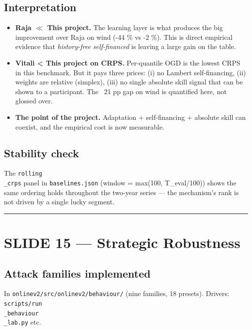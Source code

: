 \documentclass[11pt]{article}
\begin{document}
\subsection{Interpretation}


\begin{itemize}
\item \textbf{Raja $\ll$ This project.} The learning layer is what produces the big improvement over Raja on wind (-44 \% vs -2 \%). This is direct empirical evidence that \emph{history-free self-financed} is leaving a large gain on the table.
\item \textbf{Vitali < This project on CRPS.} Per-quantile OGD is the lowest CRPS in this benchmark. But it pays three prices: (i) no Lambert self-financing, (ii) weights are relative (simplex), (iii) no single absolute skill signal that can be shown to a participant. The ~21 pp gap on wind is quantified here, not glossed over.
\item \textbf{The point of the project.} Adaptation + self-financing + absolute skill can coexist, and the empirical cost is now measurable.
\end{itemize}

\subsection{Stability check}


The \texttt{rolling\\_crps} panel in \texttt{baselines.json} (window = max(100, T\_eval/100)) shows the same ordering holds throughout the two-year series --- the mechanism's rank is not driven by a single lucky segment.

\bigskip\hrule\bigskip

\section{SLIDE 15 --- Strategic Robustness}


\subsection{Attack families implemented}


In \texttt{onlinev2/src/onlinev2/behaviour/} (nine families, 18 presets). Drivers: \texttt{scripts/run\\_behaviour\\_lab.py} etc.
\end{document}
